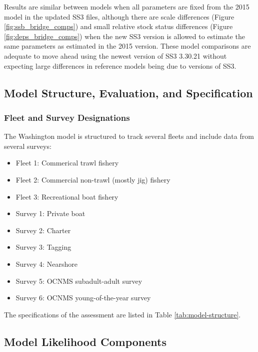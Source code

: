 \documentclass[11pt,
  letterpaper,
]{article}
\providecommand{\tightlist}{%
  \setlength{\itemsep}{0pt}\setlength{\parskip}{0pt}}
\providecommand{\tightlist}{%
  \setlength{\itemsep}{0pt}\setlength{\parskip}{0pt}}
\begin{document}
Results are similar between models when all parameters are fixed from the 2015 model in the updated SS3 files, although there are scale differences (Figure \ref{fig:ssb_bridge_comps}) and small relative stock status differences (Figure \ref{fig:deps_bridge_comps}) when the new SS3 version is allowed to estimate the same parameters as estimated in the 2015 version. These model comparisons are adequate to move ahead using the newest version of SS3 3.30.21 without expecting large differences in reference models being due to versions of SS3.

\hypertarget{model-structure-evaluation-and-specification}{%
\subsection{Model Structure, Evaluation, and Specification}\label{model-structure-evaluation-and-specification}}

\hypertarget{fleet-and-survey-designations}{%
\subsubsection{Fleet and Survey Designations}\label{fleet-and-survey-designations}}

The Washington model is structured to track several fleets and include data from several surveys:

\begin{itemize}
\tightlist
\item
  Fleet 1: Commerical trawl fishery
\item
  Fleet 2: Commercial non-trawl (mostly jig) fishery
\item
  Fleet 3: Recreational boat fishery
\item
  Survey 1: Private boat\\
\item
  Survey 2: Charter
\item
  Survey 3: Tagging
\item
  Survey 4: Nearshore
\item
  Survey 5: OCNMS subadult-adult survey
\item
  Survey 6: OCNMS young-of-the-year survey
\end{itemize}

The specifications of the assessment are listed in Table \ref{tab:model-structure}.

\hypertarget{model-likelihood-components}{%
\subsection{Model Likelihood Components}\label{model-likelihood-components}}
\end{document}
